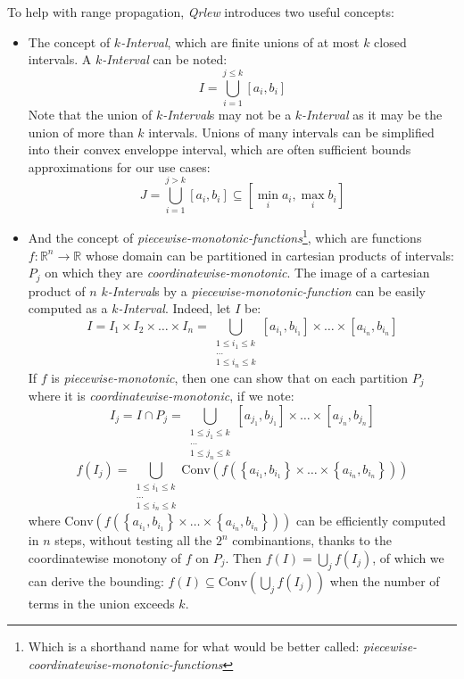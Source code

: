 \documentclass[letterpaper]{article} %
\newcommand{\qrlew}{\emph{Qrlew}}
\begin{document}
To help with range propagation, \qrlew{} introduces two useful concepts:
\begin{itemize}
    \item The concept of \emph{$k$-Interval}, which are finite unions of at most $k$ closed intervals. A \emph{$k$-Interval} can be noted:
    $$I = \bigcup_{i=1}^{j\leq k}\left[a_i, b_i\right]$$
    Note that the union of \emph{$k$-Interval}s may not be a \emph{$k$-Interval} as it may be the union of more than $k$ intervals.
    Unions of many intervals can be simplified into their convex enveloppe interval, which are often sufficient bounds approximations for our use cases:
    $$J = \bigcup_{i=1}^{j> k}\left[a_i, b_i\right] \subseteq \left[\min_i a_i, \max_i b_i\right]$$
    \item And the concept of \emph{piecewise-monotonic-functions}\footnote{Which is a shorthand name for what would be better called: \emph{piecewise-coordinatewise-monotonic-functions}}, which are functions $f: \mathbb{R}^n \rightarrow \mathbb{R}$ whose domain can be partitioned in cartesian products of intervals: $P_j$ on which they are \emph{coordinatewise-monotonic}.
    The image of a cartesian product of $n$ \emph{$k$-Interval}s by a \emph{piecewise-monotonic-function} can be easily computed as a \emph{$k$-Interval}.
    Indeed, let $I$ be:
    $$I = I_1\times I_2\times \ldots \times I_n = \bigcup_{\substack{1\leq i_1\leq k\\\ldots\\1\leq i_n\leq k}}\left[a_{i_1}, b_{i_1}\right]\times \ldots \times \left[a_{i_n}, b_{i_n}\right]$$
    If $f$ is \emph{piecewise-monotonic}, then one can show that on each partition $P_j$ where it is \emph{coordinatewise-monotonic}, if we note:
    $$I_j = I \cap P_j = \bigcup_{\substack{1\leq j_1\leq k\\\ldots\\1\leq j_n\leq k}}\left[a_{j_1}, b_{j_1}\right]\times \ldots \times \left[a_{j_n}, b_{j_n}\right]$$
    $$f(I_j) = \bigcup_{\substack{1\leq i_1\leq k\\\ldots\\1\leq i_n\leq k}}\text{Conv}\left(f\left( \left\{a_{i_1}, b_{i_1}\right\}\times \ldots \times \left\{a_{i_n}, b_{i_n}\right\}\right)\right)$$
    where $\text{Conv}\left(f\left( \left\{a_{i_1}, b_{i_1}\right\}\times \ldots \times \left\{a_{i_n}, b_{i_n}\right\}\right)\right)$ can be efficiently computed in $n$ steps, without testing all the $2^n$ combinantions, thanks to the coordinatewise monotony of $f$ on $P_j$.
    Then $f(I) = \bigcup_j f(I_j)$, of which we can derive the bounding: $f(I) \subseteq \text{Conv}\left(\bigcup_j f(I_j)\right)$ when the number of terms in the union exceeds $k$.
\end{itemize}
\end{document}
